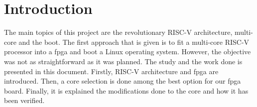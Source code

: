 \section{Introduction}
The main topics of this project are the revolutionary RISC-V architecture, multi-core and the boot. The first approach that is given is to 
fit a multi-core RISC-V processor into a \gls{fpga} and boot a Linux operating system. However, the objective was not as straightforward as it was planned. The study and the work done is presented in this document. Firstly, RISC-V architecture and \gls{fpga} are introduced. Then, a core selection is done among the best option for our \gls{fpga} board. Finally, it is explained the modifications done to the core and how it has been verified. 
